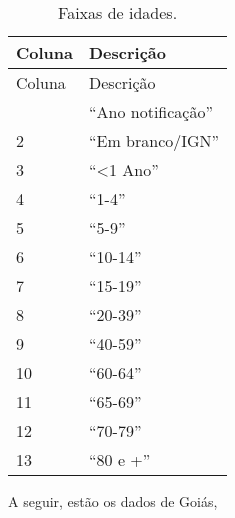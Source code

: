 \documentclass[
]{article}
\begin{document}
\begin{longtable}[]{@{}ll@{}}
\caption{Faixas de idades.}\tabularnewline
\toprule\noalign{}
Coluna & Descrição \\
\midrule\noalign{}
\endfirsthead
\toprule\noalign{}
Coluna & Descrição \\
\midrule\noalign{}
\endhead
\bottomrule\noalign{}
\endlastfoot
1 & ``Ano notificação'' \\
2 & ``Em branco/IGN'' \\
3 & ``\textless1 Ano'' \\
4 & ``1-4'' \\
5 & ``5-9'' \\
6 & ``10-14'' \\
7 & ``15-19'' \\
8 & ``20-39'' \\
9 & ``40-59'' \\
10 & ``60-64'' \\
11 & ``65-69'' \\
12 & ``70-79'' \\
13 & ``80 e +'' \\
\end{longtable}

A seguir, estão os dados de Goiás,
\end{document}
